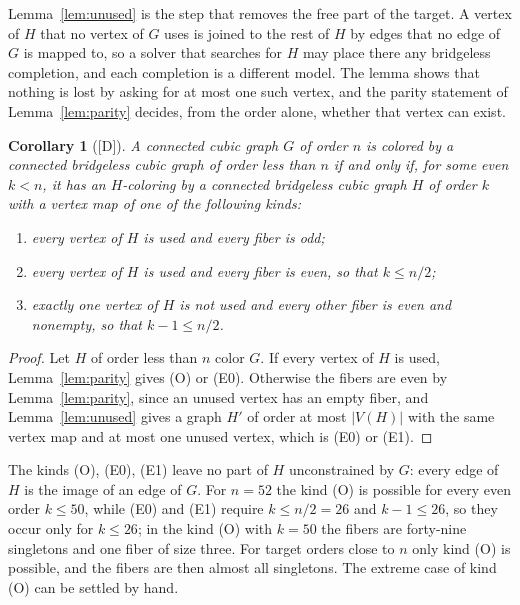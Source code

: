 \documentclass[11pt]{article}
\newtheorem{corollary}[theorem]{Corollary}
\theoremstyle{definition}
\theoremstyle{remark}
\newcommand{\evD}{\textnormal{[D]}}
\begin{document}
Lemma~\ref{lem:unused} is the step that removes the free part of the target. A vertex of $H$ that no vertex of $G$
uses is joined to the rest of $H$ by edges that no edge of $G$ is mapped to, so a solver that searches for $H$ may place
there any bridgeless completion, and each completion is a different model. The lemma shows that nothing is lost by
asking for at most one such vertex, and the parity statement of Lemma~\ref{lem:parity} decides, from the order alone, whether
that vertex can exist.

\begin{corollary}[\evD]\label{cor:modes}
A connected cubic graph $G$ of order $n$ is colored by a connected bridgeless cubic graph of order
less than $n$ if and only if, for some even $k < n$, it has an $H$-coloring by a connected
bridgeless cubic graph $H$ of order $k$ with a vertex map of one of the following kinds:
\begin{enumerate}
\item[\textup{(O)}] every vertex of $H$ is used and every fiber is odd;
\item[\textup{(E0)}] every vertex of $H$ is used and every fiber is even, so that $k \le n/2$;
\item[\textup{(E1)}] exactly one vertex of $H$ is not used and every other fiber is even and
nonempty, so that $k - 1 \le n/2$.
\end{enumerate}
\end{corollary}

\begin{proof}
Let $H$ of order less than $n$ color $G$. If every vertex of $H$ is used, Lemma~\ref{lem:parity}
gives (O) or (E0). Otherwise the fibers are even by Lemma~\ref{lem:parity}, since an unused vertex
has an empty fiber, and Lemma~\ref{lem:unused} gives a graph $H'$ of order at most $|V(H)|$ with
the same vertex map and at most one unused vertex, which is (E0) or (E1).
\end{proof}

The kinds (O), (E0), (E1) leave no part of $H$ unconstrained by $G$: every edge of $H$ is the image
of an edge of $G$. For $n = 52$ the kind (O) is possible for every even order $k \le 50$, while (E0) and
(E1) require $k \le n/2 = 26$ and $k - 1 \le 26$, so they occur only for $k \le 26$; in the kind (O) with $k = 50$
the fibers are forty-nine singletons and one fiber of size three. For target orders close to $n$ only kind (O) is possible, and the fibers are then
almost all singletons. The extreme case of kind (O) can be settled by hand.
\end{document}
